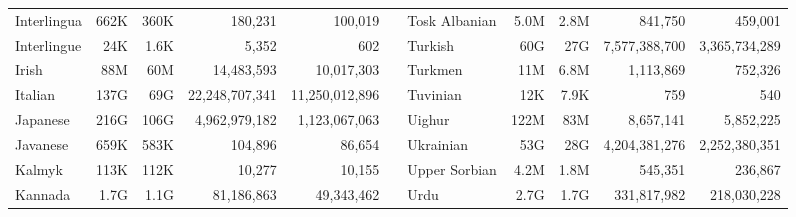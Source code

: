 \begin{table*}[t!]
{\begin{tabular}{@{}lrrrrclrrrr@{}}
            Interlingua               & 662K                     & 360K                      & 180,231                  & 100,019                   &                          & Tosk Albanian             & 5.0M                     & 2.8M                      & 841,750                  & 459,001                   \\
            Interlingue               & 24K                      & 1.6K                      & 5,352                    & 602                       &                          & Turkish                   & 60G                      & 27G                       & 7,577,388,700            & 3,365,734,289             \\
            Irish                     & 88M                      & 60M                       & 14,483,593               & 10,017,303                &                          & Turkmen                   & 11M                      & 6.8M                      & 1,113,869                & 752,326                   \\
            Italian                   & 137G                     & 69G                       & 22,248,707,341           & 11,250,012,896            &                          & Tuvinian                  & 12K                      & 7.9K                      & 759                      & 540                       \\
            Japanese                  & 216G                     & 106G                      & 4,962,979,182            & 1,123,067,063             &                          & Uighur                    & 122M                     & 83M                       & 8,657,141                & 5,852,225                 \\
            Javanese                  & 659K                     & 583K                      & 104,896                  & 86,654                    &                          & Ukrainian                 & 53G                      & 28G                       & 4,204,381,276            & 2,252,380,351             \\
            Kalmyk                    & 113K                     & 112K                      & 10,277                   & 10,155                    &                          & Upper Sorbian             & 4.2M                     & 1.8M                      & 545,351                  & 236,867                   \\
            Kannada                   & 1.7G                     & 1.1G                      & 81,186,863               & 49,343,462                &                          & Urdu                      & 2.7G                     & 1.7G                      & 331,817,982              & 218,030,228               \\

\end{tabular}}
\end{table*}
